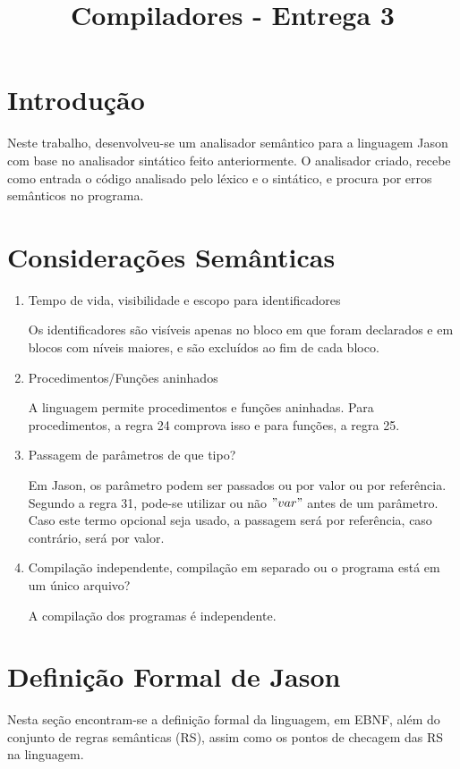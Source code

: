 \documentclass[a4paper,12pt]{article}
\title{Compiladores - Entrega 3}
\begin{document}

\tableofcontents
\clearpage

\section{Introdução}
	Neste trabalho, desenvolveu-se um analisador semântico para a linguagem Jason com base no analisador sintático feito anteriormente. O analisador criado, recebe como entrada o código analisado pelo léxico e o sintático, e procura por erros semânticos no programa.
    
\section{Considerações Semânticas}
    \begin{enumerate}
    	\item  Tempo de vida, visibilidade e escopo para identificadores
        	
            
            Os identificadores são visíveis apenas no bloco em que foram declarados e em blocos com níveis maiores, e são excluídos ao fim de cada bloco.
            
        
        \item Procedimentos/Funções aninhados
        
        	A linguagem permite procedimentos e funções aninhadas. Para procedimentos,  a regra 24 comprova isso e para funções, a regra 25.
        
        \item Passagem de parâmetros de que tipo?
        	
            Em Jason, os parâmetro podem ser passados ou por valor ou por referência. Segundo a regra 31, pode-se utilizar ou não $"var"$ antes de um parâmetro. Caso este termo opcional seja usado, a passagem será por referência, caso contrário, será por valor.
        
        \item Compilação independente, compilação em separado ou o programa está em um
único arquivo? 
        
        A compilação dos programas é independente.
        
    \end{enumerate}

\section{Definição Formal de Jason}
	Nesta seção encontram-se a definição formal da linguagem, em EBNF, além do conjunto de regras semânticas (RS), assim como os pontos de checagem das RS na linguagem.
    
\end{document}
